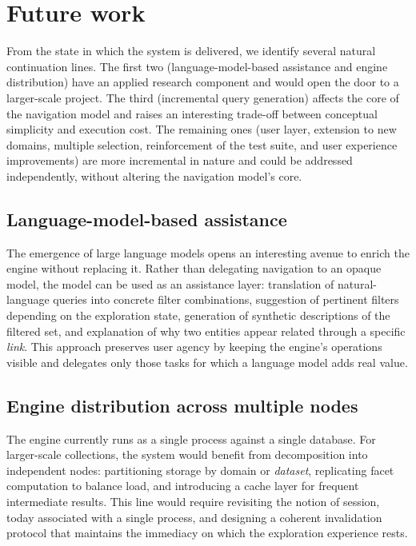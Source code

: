\section*{Future work}

From the state in which the system is delivered, we identify several natural continuation
lines. The first two (language-model-based assistance and engine distribution) have an applied
research component and would open the door to a larger-scale project. The third (incremental
query generation) affects the core of the navigation model and raises an interesting trade-off
between conceptual simplicity and execution cost. The remaining ones (user layer, extension
to new domains, multiple selection, reinforcement of the test suite, and user experience
improvements) are more incremental in nature and could be addressed independently, without
altering the navigation model's core.

\subsection*{Language-model-based assistance}

The emergence of large language models opens an interesting avenue to enrich the engine without
replacing it. Rather than delegating navigation to an opaque model, the model can be used as an
assistance layer: translation of natural-language queries into concrete filter combinations,
suggestion of pertinent filters depending on the exploration state, generation of synthetic
descriptions of the filtered set, and explanation of why two entities appear related through a
specific \textit{link}. This approach preserves user agency by keeping the engine's operations
visible and delegates only those tasks for which a language model adds real value.

\subsection*{Engine distribution across multiple nodes}

The engine currently runs as a single process against a single database. For larger-scale
collections, the system would benefit from decomposition into independent nodes: partitioning
storage by domain or \textit{dataset}, replicating facet computation to balance load, and
introducing a cache layer for frequent intermediate results. This line would require revisiting
the notion of session, today associated with a single process, and designing a coherent
invalidation protocol that maintains the immediacy on which the exploration experience rests.

